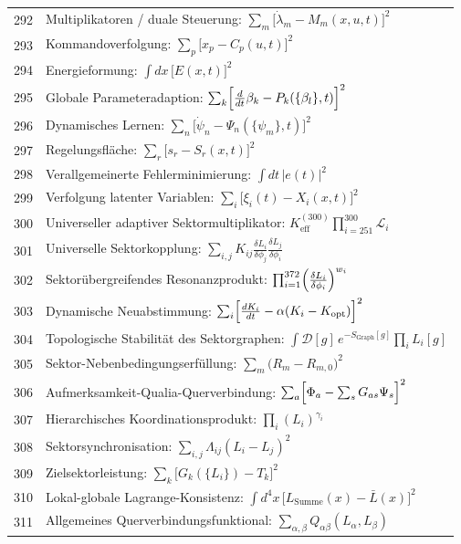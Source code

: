 \documentclass[11pt,a4paper]{article}
\begin{document}
\begin{longtable}{r l}
		292 & Multiplikatoren / duale Steuerung: $\sum_m\bigl[\dot\lambda_m - M_m(x,u,t)\bigr]^2$ \\
		293 & Kommandoverfolgung: $\sum_p\bigl[x_p - C_p(u,t)\bigr]^2$ \\
		294 & Energieformung: $\int dx\,\bigl[E(x,t)\bigr]^2$ \\
		295 & Globale Parameteradaption: $\sum_k\Bigl[\frac{d}{dt}\beta_k - P_k(\{\beta_l\},t)\Bigr]^2$ \\
		296 & Dynamisches Lernen: $\sum_n\bigl[\dot\psi_n - \Psi_n(\{\psi_m\},t)\bigr]^2$ \\
		297 & Regelungsfläche: $\sum_r\bigl[s_r - S_r(x,t)\bigr]^2$ \\
		298 & Verallgemeinerte Fehlerminimierung: $\int dt\,|e(t)|^2$ \\
		299 & Verfolgung latenter Variablen: $\sum_i\bigl[\xi_i(t) - X_i(x,t)\bigr]^2$ \\
		300 & Universeller adaptiver Sektormultiplikator: $K^{(300)}_{\mathrm{eff}}\prod_{i=251}^{300}\mathcal{L}_i$ \\
		301 & Universelle Sektorkopplung: $\sum_{i,j}K_{ij}\frac{\delta L_i}{\delta\phi_j}\frac{\delta L_j}{\delta\phi_i}$ \\
		302 & Sektorübergreifendes Resonanzprodukt: $\prod_{i=1}^{372}\Bigl(\frac{\delta L_i}{\delta\phi_i}\Bigr)^{w_i}$ \\
		303 & Dynamische Neuabstimmung: $\sum_i\Bigl[\frac{dK_i}{dt} - \alpha(K_i - K_{\text{opt}})\Bigr]^2$ \\
		304 & Topologische Stabilität des Sektorgraphen: $\int\mathcal{D}[g]\,e^{-S_{\text{Graph}}[g]}\prod_i L_i[g]$ \\
		305 & Sektor-Nebenbedingungserfüllung: $\sum_m\bigl(R_m - R_{m,0}\bigr)^2$ \\
		306 & Aufmerksamkeit-Qualia-Querverbindung: $\sum_a\Bigl[\Phi_a - \sum_s G_{as}\Psi_s\Bigr]^2$ \\
		307 & Hierarchisches Koordinationsprodukt: $\prod_i(L_i)^{\gamma_i}$ \\
		308 & Sektorsynchronisation: $\sum_{i,j}\Lambda_{ij}(L_i - L_j)^2$ \\
		309 & Zielsektorleistung: $\sum_k\bigl[G_k(\{L_i\}) - T_k\bigr]^2$ \\
		310 & Lokal-globale Lagrange-Konsistenz: $\int d^4x\,\bigl[L_{\text{Summe}}(x) - \bar L(x)\bigr]^2$ \\
		311 & Allgemeines Querverbindungsfunktional: $\sum_{\alpha,\beta}Q_{\alpha\beta}(L_\alpha,L_\beta)$ \\

\end{longtable}
\end{document}
